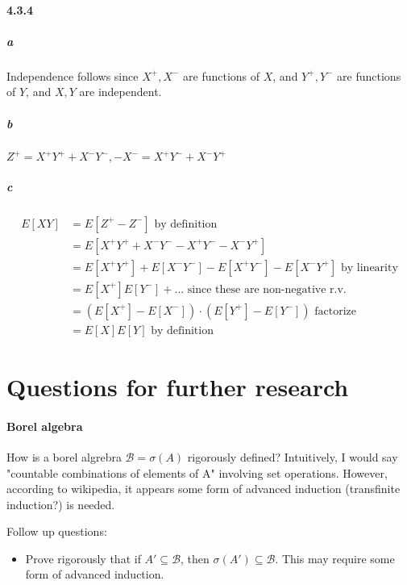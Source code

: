 \documentclass[a4paper]{article}
\newcommand{\borel}[0]{\mathcal{B}} %
\begin{document}
\paragraph{4.3.4}
\subparagraph{a} Independence follows since $X^+,X^-$ are functions of $X$, and $Y^+,Y^-$ are functions of $Y$, and $X, Y$ are independent.
\subparagraph{b} $Z^+ = X^+Y^+ + X^-Y^-, -X^- = X^+Y^- + X^-Y^+$
\subparagraph{c} 
\begin{align*}
	E[XY] &= E[Z^+-Z^-]\text{ by definition}\\
	&= E[X^+Y^+ + X^-Y^- - X^+Y^- - X^-Y^+]\\
	&= E[X^+Y^+] + E[X^-Y^-] - E[X^+Y^-] - E[X^-Y^+]\text{ by linearity}\\
	&= E[X^+]E[Y^-] + \dots \text{ since these are non-negative r.v.}\\
	&= (E[X^+]-E[X^-])\cdot(E[Y^+]-E[Y^-])\text{ factorize}\\
	&= E[X]E[Y]\text{ by definition}
\end{align*}

\section*{Questions for further research}
\paragraph{Borel algebra} How is a borel algrebra $\borel = \sigma(A)$ rigorously defined? Intuitively, I would say "countable combinations of elements of A" involving set operations. However, according to wikipedia, it appears some form of advanced induction (transfinite induction?) is needed.

Follow up questions:
\begin{itemize}
	\item Prove rigorously that if $A'\subseteq \borel$, then $\sigma(A')\subseteq \borel$. This may require some form of advanced induction.
\end{itemize}
\end{document}
